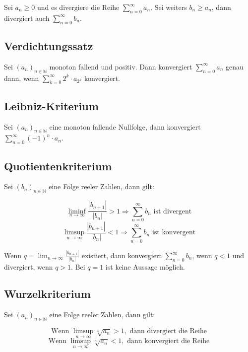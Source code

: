 \documentclass[10pt,twocolumn]{article}
\newcommand{\ra}{\rightarrow}
\begin{document}
Sei $a_n \geq 0$ und es divergiere die Reihe $\sum_{n=0}^\infty a_n$.
Sei weiters $b_n \geq a_n$, dann divergiert auch $\sum_{n=0}^\infty b_n$.

\subsection{Verdichtungssatz}

Sei $(a_n)_{n\in\mathbb{N}}$ monoton fallend und positiv. Dann konvergiert
$\sum_{n=0}^\infty a_n$ genau dann, wenn $\sum_{k=0}^\infty 2^k
\cdot a_{2^k}$ konvergiert.

\subsection{Leibniz-Kriterium}

Sei $(a_n)_{n\in\mathbb{N}}$ eine monoton fallende Nullfolge, dann
konvergiert $\sum_{n=0}^\infty (-1)^n \cdot a_n$.

\subsection{Quotientenkriterium}

Sei $(b_n)_{n\in\mathbb{N}}$ eine Folge reeler Zahlen, dann gilt:

\begin{equation}
    \liminf_{n\ra\infty} \frac{| b_{n+1} |}{| b_n |} > 1 \Rightarrow
        \sum_{n=0}^\infty b_n \text{ ist divergent}
\end{equation}
\begin{equation}
    \limsup_{n\ra\infty} \frac{| b_{n+1} |}{| b_n |} < 1 \Rightarrow
        \sum_{n=0}^\infty b_n \text{ ist konvergent}
\end{equation}

Wenn $q = \lim_{n\rightarrow\infty} \frac{| b_{n+1} |}{| b_n |}$ existiert,
dann konvergiert $\sum_{n=0}^\infty b_n$, wenn $q < 1$ und divergiert,
wenn $q > 1$. Bei $q = 1$ ist keine Aussage möglich.

\subsection{Wurzelkriterium}

Sei $(a_n)_{n\in\mathbb{N}}$ eine Folge reeler Zahlen, dann gilt:

\begin{equation}
    \text{Wenn } \limsup_{n\rightarrow\infty} \sqrt[n]{a_n} > 1,
    \text{ dann divergiert die Reihe}
\end{equation}
\begin{equation}
    \text{Wenn } \limsup_{n\rightarrow\infty} \sqrt[n]{a_n} < 1,
    \text{ dann konvergiert die Reihe}
\end{equation}
\end{document}
